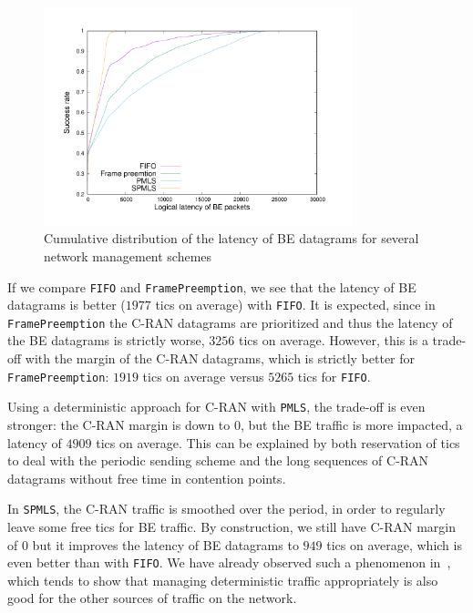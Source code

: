 \documentclass[a4paper,10pt]{article}
\newcommand\PMLS{\texttt{PMLS}\xspace}
\newcommand\SPMLS{\texttt{SPMLS}\xspace}
\newcommand\FIFO{\texttt{FIFO}\xspace}
\newcommand\framepre{\texttt{FramePreemption}\xspace}
\begin{document}
     \begin{figure}
       \begin{center}
      \includegraphics[width = 0.8\textwidth]{res.pdf}
      \end{center}
      \caption{Cumulative distribution of the latency of BE datagrams for several network management schemes}
      \label{fig:belatency}   
     \end{figure}    
     

     If we compare \FIFO and \framepre, we see that the latency of BE datagrams is better ($1977$ tics on average) with \FIFO. It is expected, since in \framepre the C-RAN datagrams are prioritized and thus 
     the latency of the BE datagrams is strictly worse, $3256$ tics on average. However, this is a trade-off with the margin of the C-RAN datagrams, which is strictly better for \framepre: $1919$ tics on average versus $5265$ tics for \FIFO. 

     Using a deterministic approach for C-RAN with \PMLS, the trade-off is even stronger:
      the C-RAN margin is down to $0$, but the BE traffic is more impacted, a latency of $4909$ tics on average. This can be explained by both reservation of tics to deal with the periodic sending scheme and the long sequences of C-RAN datagrams without free time in contention points.
     
     In \SPMLS, the C-RAN traffic is smoothed over the period, in order to regularly leave some free tics for BE traffic. By construction, we still have C-RAN margin of $0$ but it improves the latency of 
     BE datagrams to $949$ tics on average, which is even better than with \FIFO. 
     We have already observed such a phenomenon in~\cite{DBLP:conf/ondm/BarthGS19}, which tends to show that managing deterministic traffic appropriately is also good for the other sources of traffic on the network.
   
\end{document}
